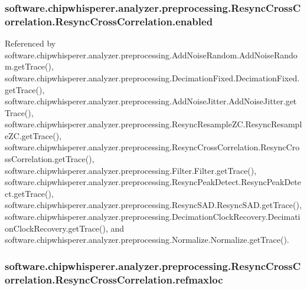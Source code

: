 \subsubsection[{enabled}]{\setlength{\rightskip}{0pt plus 5cm}software.\+chipwhisperer.\+analyzer.\+preprocessing.\+Resync\+Cross\+Correlation.\+Resync\+Cross\+Correlation.\+enabled}\label{classsoftware_1_1chipwhisperer_1_1analyzer_1_1preprocessing_1_1ResyncCrossCorrelation_1_1ResyncCrossCorrelation_a3874af5f74706b4c19b2d5572221f0d6}


Referenced by software.\+chipwhisperer.\+analyzer.\+preprocessing.\+Add\+Noise\+Random.\+Add\+Noise\+Random.\+get\+Trace(), software.\+chipwhisperer.\+analyzer.\+preprocessing.\+Decimation\+Fixed.\+Decimation\+Fixed.\+get\+Trace(), software.\+chipwhisperer.\+analyzer.\+preprocessing.\+Add\+Noise\+Jitter.\+Add\+Noise\+Jitter.\+get\+Trace(), software.\+chipwhisperer.\+analyzer.\+preprocessing.\+Resync\+Resample\+Z\+C.\+Resync\+Resample\+Z\+C.\+get\+Trace(), software.\+chipwhisperer.\+analyzer.\+preprocessing.\+Resync\+Cross\+Correlation.\+Resync\+Cross\+Correlation.\+get\+Trace(), software.\+chipwhisperer.\+analyzer.\+preprocessing.\+Filter.\+Filter.\+get\+Trace(), software.\+chipwhisperer.\+analyzer.\+preprocessing.\+Resync\+Peak\+Detect.\+Resync\+Peak\+Detect.\+get\+Trace(), software.\+chipwhisperer.\+analyzer.\+preprocessing.\+Resync\+S\+A\+D.\+Resync\+S\+A\+D.\+get\+Trace(), software.\+chipwhisperer.\+analyzer.\+preprocessing.\+Decimation\+Clock\+Recovery.\+Decimation\+Clock\+Recovery.\+get\+Trace(), and software.\+chipwhisperer.\+analyzer.\+preprocessing.\+Normalize.\+Normalize.\+get\+Trace().

\hypertarget{classsoftware_1_1chipwhisperer_1_1analyzer_1_1preprocessing_1_1ResyncCrossCorrelation_1_1ResyncCrossCorrelation_a64cc985011fb96fec6197345db95c84b}{}
\subsubsection[{refmaxloc}]{\setlength{\rightskip}{0pt plus 5cm}software.\+chipwhisperer.\+analyzer.\+preprocessing.\+Resync\+Cross\+Correlation.\+Resync\+Cross\+Correlation.\+refmaxloc}\label{classsoftware_1_1chipwhisperer_1_1analyzer_1_1preprocessing_1_1ResyncCrossCorrelation_1_1ResyncCrossCorrelation_a64cc985011fb96fec6197345db95c84b}


